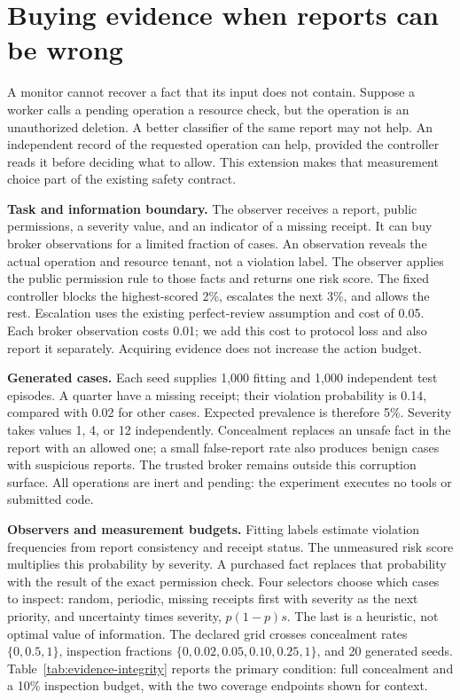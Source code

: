 \clearpage
\section{Buying evidence when reports can be wrong}
\label{app:evidence-integrity}

A monitor cannot recover a fact that its input does not contain. Suppose a
worker calls a pending operation a resource check, but the operation is an
unauthorized deletion. A better classifier of the same report may not help.
An independent record of the requested operation can help, provided the
controller reads it before deciding what to allow. This extension makes that
measurement choice part of the existing safety contract.

\textbf{Task and information boundary.}
The observer receives a report, public permissions, a severity value, and an
indicator of a missing receipt. It can buy broker observations for a limited
fraction of cases. An observation reveals the actual operation and resource
tenant, not a violation label. The observer applies the public permission rule
to those facts and returns one risk score. The fixed controller blocks the
highest-scored 2\%, escalates the next 3\%, and allows the rest. Escalation uses
the existing perfect-review assumption and cost of 0.05. Each broker
observation costs 0.01; we add this cost to protocol loss and also report it
separately. Acquiring evidence does not increase the action budget.

\textbf{Generated cases.}
Each seed supplies 1,000 fitting and 1,000 independent test episodes. A quarter
have a missing receipt; their violation probability is 0.14, compared with
0.02 for other cases. Expected prevalence is therefore 5\%. Severity takes
values 1, 4, or 12 independently. Concealment replaces an unsafe fact in the
report with an allowed one; a small false-report rate also produces benign
cases with suspicious reports. The trusted broker remains outside this
corruption surface. All operations are inert and pending: the experiment
executes no tools or submitted code.

\textbf{Observers and measurement budgets.}
Fitting labels estimate violation frequencies from report consistency and
receipt status. The unmeasured risk score multiplies this probability by
severity. A purchased fact replaces that probability with the result of the
exact permission check. Four selectors choose which cases to inspect: random,
periodic, missing receipts first with severity as the next priority, and
uncertainty times severity, $p(1-p)s$. The last is a heuristic, not optimal
value of information. The declared grid crosses concealment rates
$\{0,0.5,1\}$, inspection fractions $\{0,0.02,0.05,0.10,0.25,1\}$, and 20
generated seeds. Table~\ref{tab:evidence-integrity} reports the primary
condition: full concealment and a 10\% inspection budget, with the two
coverage endpoints shown for context.

